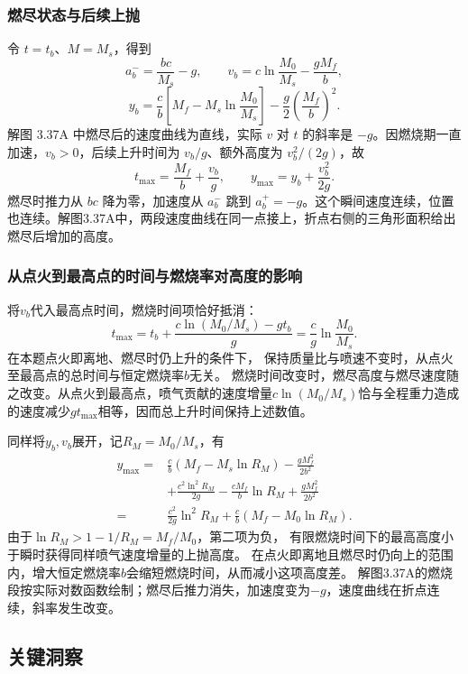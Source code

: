 \documentclass[UTF8,fontset=fandol,a4paper,11pt]{ctexart}
\begin{document}
\subsubsection*{燃尽状态与后续上抛}
令 $t=t_b$、$M=M_s$，得到
\[
a_b^-=\frac{bc}{M_s}-g,\qquad
v_b=c\ln\frac{M_0}{M_s}-\frac{gM_f}{b},
\]
\[
y_b=\frac cb\left[M_f-M_s\ln\frac{M_0}{M_s}\right]
-\frac g2\left(\frac{M_f}{b}\right)^2.
\]
解图 3.37A 中燃尽后的速度曲线为直线，实际 $v$ 对 $t$ 的斜率是 $-g$。因燃烧期一直加速，$v_b>0$，后续上升时间为 $v_b/g$、额外高度为 $v_b^2/(2g)$，故
\[
\boxed{t_{\max}=\frac{M_f}{b}+\frac{v_b}{g}},\qquad
\boxed{y_{\max}=y_b+\frac{v_b^2}{2g}}.
\]
燃尽时推力从 $bc$ 降为零，加速度从 $a_b^-$ 跳到 $a_b^+=-g$。这个瞬间速度连续，位置也连续。解图3.37A中，两段速度曲线在同一点接上，折点右侧的三角形面积给出燃尽后增加的高度。
\subsubsection*{从点火到最高点的时间与燃烧率对高度的影响}
将$v_b$代入最高点时间，燃烧时间项恰好抵消：
\[
t_{\max}=t_b+\frac{c\ln(M_0/M_s)-gt_b}{g}
=\boxed{\frac cg\ln\frac{M_0}{M_s}}.
\]
在本题点火即离地、燃尽时仍上升的条件下，
保持质量比与喷速不变时，从点火至最高点的总时间与恒定燃烧率$b$无关。
燃烧时间改变时，燃尽高度与燃尽速度随之改变。从点火到最高点，喷气贡献的速度增量$c\ln(M_0/M_s)$恰与全程重力造成的速度减少$gt_{\max}$相等，因而总上升时间保持上述数值。

同样将$y_b,v_b$展开，记$R_M=M_0/M_s$，有
\[
\begin{aligned}
y_{\max}
={}&\frac cb(M_f-M_s\ln R_M)-\frac{gM_f^2}{2b^2}\\
&+\frac{c^2\ln^2R_M}{2g}-\frac{cM_f}{b}\ln R_M
+\frac{gM_f^2}{2b^2}\\
={}&\boxed{\frac{c^2}{2g}\ln^2R_M
+\frac cb(M_f-M_0\ln R_M)}.
\end{aligned}
\]
由于$\ln R_M>1-1/R_M=M_f/M_0$，第二项为负，
有限燃烧时间下的最高高度小于瞬时获得同样喷气速度增量的上抛高度。
在点火即离地且燃尽时仍向上的范围内，增大恒定燃烧率$b$会缩短燃烧时间，从而减小这项高度差。
解图3.37A的燃烧段按实际对数函数绘制；燃尽后推力消失，加速度变为$-g$，速度曲线在折点连续，斜率发生改变。




\subsection*{关键洞察}
\end{document}
